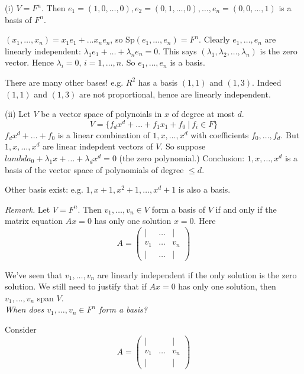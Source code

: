 \documentclass[10pt]{scrartcl}
\begin{document}
\begin{examples}

(i) $V = F^n$. Then $e_1 = (1,0,\dots,0), e_2 = (0,1,\dots,0), \dots, e_n = (0,0,\dots,1)$ is a basis of $F^n$. 

$(x_1,\dots,x_n) = x_1e_1 + \dots x_ne_n$, so Sp$(e_1,\dots,e_n) = F^n$. Clearly $e_1,\dots,e_n$ are linearly independent: $\lambda_1e_1 + \dots + \lambda_ne_n = 0$. This says $(\lambda_1,\lambda_2,\dots,\lambda_n)$ is the zero vector. Hence $\lambda_i = 0,\, i = 1,\dots,n$. So $e_1,\dots,e_n$ is a basis. 


\begin{warning}
There are many other bases! e.g. $R^2$ has a basis $(1,1)$ and $(1,3)$. Indeed $(1,1)$ and $(1,3)$ are not proportional, hence are linearly independent. 
\end{warning}


(ii) Let $V$ be a vector space of polynoials in $x$ of degree at most $d$. 
\[
  V = \{f_dx^d + \dots + f_1x_1 + f_0 ~|~ f_i \in F\}
\]
$f_dx^d + \dots + f_0$ is a linear combination of $1,x,\dots,x^d$ with coefficients $f_0,\dots,f_d$. But $1,x,\dots,x^d$ are linear indepdent vectors of $V$. So suppose $lambda_0 + \lambda_1x + \dots + \lambda_dx^d =0$ (the zero polynomial.) Conclusion: $1,x,\dots,x^d$ is a basis of the vector space of polynomials of degree $\leq d$. 

Other basis exist: e.g. $1,x+1, x^2 + 1,\dots,x^d + 1$ is also a basis.
\end{examples}\vsp


\emph{Remark.} Let $V = F^n$. Then $v_1,\dots,v_n \in V$ form a basis of $V$ if and only if the matrix equation $Ax = 0$ has only one solution $x = 0$. Here 
\[
  A =\begin{pmatrix}
 | & \dots & |\\
 v_1 & \dots & v_n\\
 | & \dots & |	
 \end{pmatrix}
\]

We've seen that $v_1,\dots,v_n$ are linearly independent if the only solution is the zero solution. We still need to justify that if $Ax = 0$ has only one solution, then $v_1,\dots,v_n$ span $V$.\\

\emph{When does {\normalfont{} }$v_1,\dots,v_n \in F^n$ form a basis?}

Consider 
\[
  A = \begin{pmatrix}
 | & & | \\ v_1 & \dots & v_n \\ | & & |	
 \end{pmatrix}
\]
\end{document}
